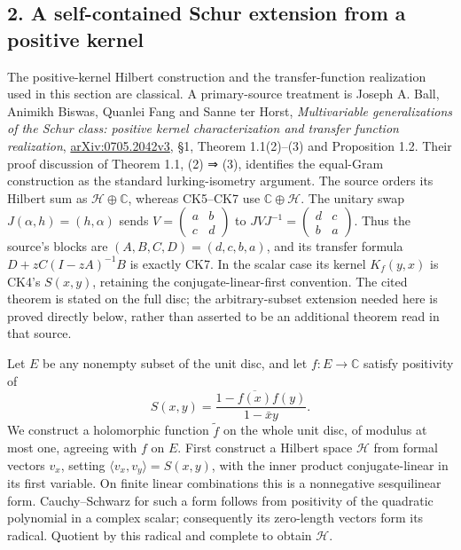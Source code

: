 \documentclass[
  10pt,
  a4paper,
]{article}
\newcounter{none} %
\begin{document}
\subsection{2. A self-contained Schur extension from a positive
kernel}\label{a-self-contained-schur-extension-from-a-positive-kernel}

The positive-kernel Hilbert construction and the transfer-function
realization used in this section are classical. A primary-source
treatment is Joseph A. Ball, Animikh Biswas, Quanlei Fang and Sanne ter
Horst, \emph{Multivariable generalizations of the Schur class: positive
kernel characterization and transfer function realization},
\href{https://arxiv.org/abs/0705.2042v3}{arXiv:0705.2042v3}, §1, Theorem
1.1(2)--(3) and Proposition 1.2. Their proof discussion of Theorem 1.1,
(2) ⇒ (3), identifies the equal-Gram construction as the standard
lurking-isometry argument. The source orders its Hilbert sum as
\(\mathcal H\oplus\mathbb C\), whereas CK5--CK7 use
\(\mathbb C\oplus\mathcal H\). The unitary swap
\(J(\alpha,h)=(h,\alpha)\) sends
\(V=\left(\begin{smallmatrix}a&b\\c&d\end{smallmatrix}\right)\) to
\(JVJ^{-1}=\left(\begin{smallmatrix}d&c\\b&a\end{smallmatrix}\right)\).
Thus the source's blocks are \((A,B,C,D)=(d,c,b,a)\), and its transfer
formula \(D+zC(I-zA)^{-1}B\) is exactly CK7. In the scalar case its
kernel \(K_f(y,x)\) is CK4's \(S(x,y)\), retaining the
conjugate-linear-first convention. The cited theorem is stated on the
full disc; the arbitrary-subset extension needed here is proved directly
below, rather than asserted to be an additional theorem read in that
source.

Let \(E\) be any nonempty subset of the unit disc, and let
\(f:E\to\mathbb C\) satisfy positivity of \[
S(x,y)=\frac{1-\overline{f(x)}f(y)}{1-\bar x y}.
\tag{CK4}
\] We construct a holomorphic function \(\widetilde f\) on the whole
unit disc, of modulus at most one, agreeing with \(f\) on \(E\). First
construct a Hilbert space \(\mathcal H\) from formal vectors \(v_x\),
setting \(\langle v_x,v_y\rangle=S(x,y)\), with the inner product
conjugate-linear in its first variable. On finite linear combinations
this is a nonnegative sesquilinear form. Cauchy--Schwarz for such a form
follows from positivity of the quadratic polynomial in a complex scalar;
consequently its zero-length vectors form its radical. Quotient by this
radical and complete to obtain \(\mathcal H\).
\end{document}
